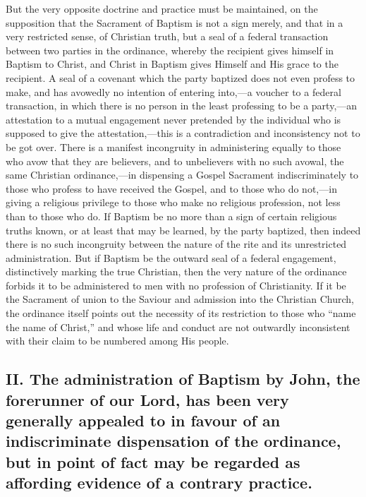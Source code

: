 \documentclass[]{book}
\begin{document}
But the very opposite doctrine and practice must be maintained, on the supposition that the Sacrament of Baptism is not a sign merely, and that in a very restricted sense, of Christian truth, but a seal of a federal transaction between two parties in the ordinance, whereby the recipient gives himself in Baptism to Christ, and Christ in Baptism gives Himself and His grace to the recipient. A seal of a covenant which the party baptized does not even profess to make, and has avowedly no intention of entering into,---a voucher to a federal transaction, in which there is no person in the least professing to be a party,---an attestation to a mutual engagement never pretended by the individual who is supposed to give the attestation,---this is a contradiction and inconsistency not to be got over. There is a manifest incongruity in administering equally to those who avow that they are believers, and to unbelievers with no such avowal, the same Christian ordinance,---in dispensing a Gospel Sacrament indiscriminately to those who profess to have received the Gospel, and to those who do not,---in giving a religious privilege to those who make no religious profession, not less than to those who do. If Baptism be no more than a sign of certain religious truths known, or at least that may be learned, by the party baptized, then indeed there is no such incongruity between the nature of the rite and its unrestricted administration. But if Baptism be the outward seal of a federal engagement, distinctively marking the true Christian, then the very nature of the ordinance forbids it to be administered to men with no profession of Christianity. If it be the Sacrament of union to the Saviour and admission into the Christian Church, the ordinance itself points out the necessity of its restriction to those who ``name the name of Christ,'' and whose life and conduct are not outwardly inconsistent with their claim to be numbered among His people.

\hypertarget{ii.-the-administration-of-baptism-by-john-the-forerunner-of-our-lord-has-been-very-generally-appealed-to-in-favour-of-an-indiscriminate-dispensation-of-the-ordinance-but-in-point-of-fact-may-be-regarded-as-affording-evidence-of-a-contrary-practice.}{%
\subsection{II. The administration of Baptism by John, the forerunner of our Lord, has been very generally appealed to in favour of an indiscriminate dispensation of the ordinance, but in point of fact may be regarded as affording evidence of a contrary practice.}\label{ii.-the-administration-of-baptism-by-john-the-forerunner-of-our-lord-has-been-very-generally-appealed-to-in-favour-of-an-indiscriminate-dispensation-of-the-ordinance-but-in-point-of-fact-may-be-regarded-as-affording-evidence-of-a-contrary-practice.}}
\end{document}
